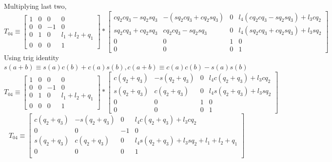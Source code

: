 \documentclass[12pt]{article}
\begin{document}
Multiplying last two,
\[
  T_{04} \equiv
  \begin{bmatrix} 1 & 0 & 0 & 0 \\ 0 & 0 & -1 & 0 \\ 0 & 1 & 0 & l_1 + l_2 + q_1 \\ 0 & 0 & 0 & 1 \end{bmatrix}
  *
  \begin{bmatrix}
    cq_2cq_3 - sq_2sq_3 & -(sq_2cq_3 + cq_2sq_3) & 0 & l_4(cq_2cq_3 - sq_2sq_3) + l_3cq_2 \\
    sq_2cq_3 + cq_2sq_3 & cq_2cq_3 - sq_2sq_3    & 0 & l_4(sq_2cq_3 + cq_2sq_3) + l_3sq_2 \\
    0                   & 0                      & 1 & 0 \\
    0                   & 0                      & 0 & 1
  \end{bmatrix}
\]
Using trig identity $s(a + b) \equiv s(a)c(b) + c(a)s(b), c(a + b) \equiv c(a)c(b) - s(a)s(b)$
\[
  T_{04} \equiv
  \begin{bmatrix} 1 & 0 & 0 & 0 \\ 0 & 0 & -1 & 0 \\ 0 & 1 & 0 & l_1 + l_2 + q_1 \\ 0 & 0 & 0 & 1 \end{bmatrix}
  *
  \begin{bmatrix}
    c(q_2 + q_3) & -s(q_2 + q_3) & 0 & l_4c(q_2 + q_3) + l_3cq_2 \\
    s(q_2 + q_3) & c(q_2 + q_3)  & 0 & l_4s(q_2 + q_3) + l_3sq_2 \\
    0            & 0             & 1 & 0 \\
    0            & 0             & 0 & 1
  \end{bmatrix}
\]
\[
  T_{04} \equiv
  \begin{bmatrix}
    c(q_2 + q_3) & -s(q_2 + q_3) & 0 & l_4c(q_2 + q_3) + l_3cq_2 \\
    0 & 0 & -1 & 0 \\
    s(q_2 + q_3) & c(q_2 + q_3)  & 0 & l_4s(q_2 + q_3) + l_3sq_2 + l_1 + l_2 + q_1 \\
    0 & 0 & 0 & 1 \\
  \end{bmatrix}
\]

\pagebreak

\section{}
\section{}
\end{document}
